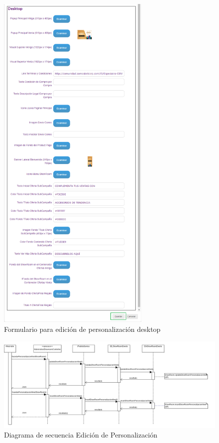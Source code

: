 \documentclass[a4paper,11pt]{paper}
\begin{document}
\begin{figure}[h]
\centering
\includegraphics[width=0.65\textwidth]{imgs/Personalizacion/FormularioEditarPersonalizacionDesktop.png}
\caption{Formulario para edición de personalización desktop}
\end{figure}

\begin{landscape}
\begin{figure}[!h]
\centering
\includegraphics[width=1.5\textwidth]{imgs/Personalizacion/GuardarPersonalizacion.png}
\caption{Diagrama de secuencia Edición de Personalización}
\end{figure}
\end{landscape} 
\end{document}
